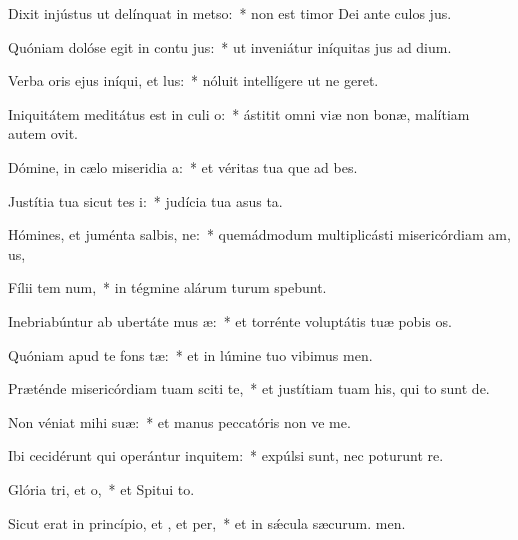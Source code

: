 \item Dixit injústus ut delínquat in metso:~* non est timor Dei ante culos jus.
\item Quóniam dolóse egit in contu jus:~* ut inveniátur iníquitas jus ad dium.
\item Verba oris ejus iníqui, et lus:~* nóluit intellígere ut ne geret.
\item Iniquitátem meditátus est in culi o:~* ástitit omni viæ non bonæ, malítiam autem  ovit.
\item Dómine, in cælo miseridia a:~* et véritas tua que ad bes.
\item Justítia tua sicut tes i:~* judícia tua asus ta.
\item Hómines, et juménta salbis, ne:~* quemádmodum multiplicásti misericórdiam am, us,
\item Fílii tem num,~* in tégmine alárum turum spebunt.
\item Inebriabúntur ab ubertáte mus æ:~* et torrénte voluptátis tuæ pobis os.
\item Quóniam apud te  fons tæ:~* et in lúmine tuo vibimus men.
\item Præténde misericórdiam tuam sciti te,~* et justítiam tuam his, qui to sunt de.
\item Non véniat mihi  suæ:~* et manus peccatóris non ve me.
\item Ibi cecidérunt qui operántur inquitem:~* expúlsi sunt, nec poturunt re.
\item Glória tri, et o,~* et Spitui to.
\item Sicut erat in princípio, et , et per,~* et in sǽcula sæcurum. men.
